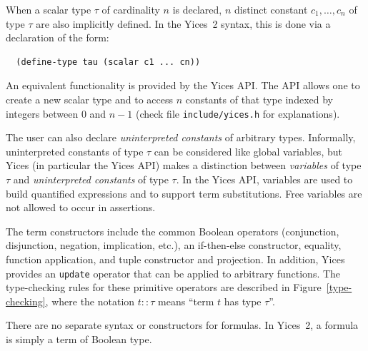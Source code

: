\documentclass[11pt,twoside,fleqn,openright,titlepage]{cslreport}
\begin{document}
\medskip\noindent
When a scalar type $\tau$ of cardinality $n$ is declared, $n$ distinct
constant   $c_1,\ldots,c_n$  of  type   $\tau$  are   also  implicitly
defined. In the Yices~2 syntax, this  is done via a declaration of the
form:
\begin{small}
\begin{verbatim}
  (define-type tau (scalar c1 ... cn))
\end{verbatim}
\end{small}
An  equivalent functionality  is provided  by the  Yices API.  The API
allows one to create a new  scalar type and to access $n$ constants of
that  type indexed  by  integers  between $0$  and  $n-1$ (check  file
\texttt{include/yices.h} for explanations).

\medskip\noindent
The user can also declare {\em uninterpreted constants\/} of arbitrary
types.  Informally,  uninterpreted constants  of  type  $\tau$ can  be
considered like  global variables, but Yices (in  particular the Yices
API) makes a distinction between  {\em variables\/} of type $\tau$ and
{\em  uninterpreted constants\/}  of type  $\tau$. In  the  Yices API,
variables are used to build quantified expressions and to support term
substitutions. Free variables are not allowed to occur in assertions.

\medskip\noindent
The   term   constructors  include   the   common  Boolean   operators
(conjunction,   disjunction,    negation,   implication,   etc.),   an
if-then-else  constructor, equality,  function application,  and tuple
constructor   and   projection.  In   addition,   Yices  provides   an
\texttt{update}   operator   that   can   be  applied   to   arbitrary
functions. The  type-checking rules for these  primitive operators are
described in Figure~\ref{type-checking},  where the notation $t::\tau$
means ``term $t$ has type $\tau$''.

\medskip\noindent
There are no separate syntax or constructors for formulas. In Yices~2,
a formula is simply a term of Boolean type.
\end{document}
